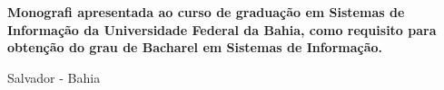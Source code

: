 

\begin{titlepage}
 \vfill
 \begin{center}
   {\large \uppercase{ \bf{ \meunome\ } } } \\[7cm]
   {\Huge \uppercase{ \bf{ \meutitulo\ } } }\\[1cm]
   \vfill
   \hspace{.45\textwidth} %
   \begin{minipage}{.5\textwidth}
     \begin{espacosimples}
       \bf{
	Monografi apresentada ao curso de graduação em Sistemas de Informação
  da Universidade Federal da Bahia, como requisito para obtenção do grau de
  Bacharel em Sistemas de Informação.\\
       }
     \end{espacosimples}
     \begin{espacosimples}
       \meuorientador
       \newline
       \meucoorientador
     \end{espacosimples}
   \end{minipage}
   \vfill
   Salvador - Bahia \\
   \meuano
 \end{center}
\end{titlepage}
